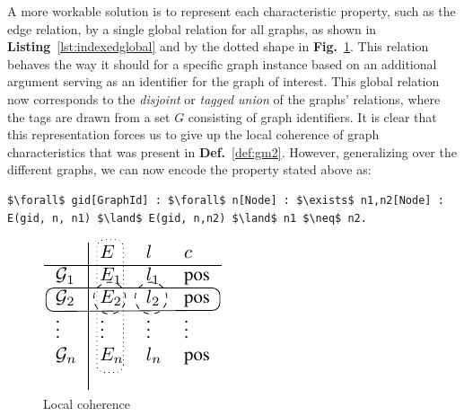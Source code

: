 A more workable solution is to represent each characteristic property, such as the edge relation, by a single global relation for all graphs, as shown in \textbf{Listing}~\ref{lst:indexedglobal} and by the dotted shape in \textbf{Fig.}~\ref{fig:LocalCoherence}.
This relation behaves the way it should for a specific graph instance based on an additional argument serving as an identifier for the graph of interest.
This global relation now corresponds to the \emph{disjoint} or \emph{tagged union} of the graphs' relations, where the tags are drawn from a set $G$ consisting of graph identifiers.
It is clear that this representation forces us to give up the local coherence of graph characteristics that was present in \textbf{Def.}~\ref{def:gm2}.
%
However, generalizing over the different graphs, we can now encode the property stated above as:
\begin{center}
\begin{minipage}{0.95\linewidth}
\begin{lstlisting}[mathescape]
$\forall$ gid[GraphId] : $\forall$ n[Node] : $\exists$ n1,n2[Node] : E(gid, n, n1) $\land$ E(gid, n,n2) $\land$ n1 $\neq$ n2.
\end{lstlisting}
\end{minipage}
\end{center}
\vspace{-1em}
\begin{figure}[h]
\centering
\includegraphics{CoherenceTable-crop.pdf}
\caption{Local coherence\label{fig:LocalCoherence}}
\end{figure}
\vspace{-2em}
